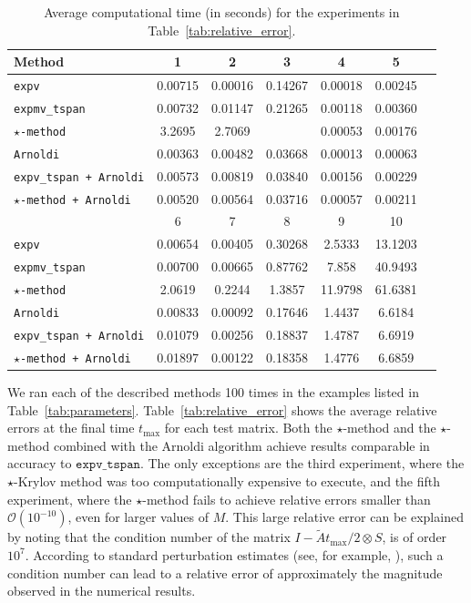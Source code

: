 \documentclass[final,1p,times,number]{elsarticle}
\theoremstyle{plain}%
\begin{document}
\begin{table}[t]
\centering
\caption{Average computational time (in seconds) for the experiments in Table~\ref{tab:relative_error}.}
\label{tab:computational_time}
\begin{tabular}{lcccccc}
\toprule
\textbf{Method} & 1 & 2 & 3 & 4 & 5  \\ 
\midrule
\texttt{expv}                     & 0.00715 & 0.00016 & 0.14267 & 0.00018 & 0.00245 \\ 
\texttt{expmv\_tspan}             & 0.00732 & 0.01147 & 0.21265 & 0.00118 & 0.00360 \\  
\texttt{$\star$-method}           & 3.2695 &  2.7069  &               & 0.00053 & 0.00176 \\ 
\texttt{Arnoldi}                  & 0.00363 & 0.00482 & 0.03668 & 0.00013 & 0.00063 \\
\texttt{expv\_tspan + Arnoldi}    & 0.00573 & 0.00819 & 0.03840 & 0.00156 & 0.00229 \\  
\texttt{$\star$-method + Arnoldi} & 0.00520 & 0.00564 & 0.03716 & 0.00057 &  0.00211 \\  
\midrule
 & 6 & 7 & 8 & 9 & 10  \\ 
\midrule
\texttt{expv}                     & 0.00654 & 0.00405 & 0.30268 & 2.5333 & 13.1203 \\
\texttt{expmv\_tspan}             & 0.00700 & 0.00665 & 0.87762 & 7.858 & 40.9493 \\    
\texttt{$\star$-method}           & 2.0619  & 0.2244  & 1.3857 & 11.9798 & 61.6381 \\
\texttt{Arnoldi}                  & 0.00833 & 0.00092 & 0.17646 & 1.4437 & 6.6184 \\
\texttt{expv\_tspan + Arnoldi}    & 0.01079 & 0.00256 & 0.18837 & 1.4787 & 6.6919 \\  
\texttt{$\star$-method + Arnoldi} & 0.01897 & 0.00122 & 0.18358 & 1.4776 & 6.6859 \\  
        \bottomrule
\end{tabular}
\end{table}

We ran each of the described methods 100 times in the examples listed in Table~\ref{tab:parameters}. Table~\ref{tab:relative_error} shows the average relative errors at the final time $t_\text{max}$ for each test matrix. Both the $\star$-method and the $\star$-method combined with the Arnoldi algorithm achieve results comparable in accuracy to $\texttt{expv\_tspan}$.
The only exceptions are the third experiment, where the $\star$-Krylov method was too computationally expensive to execute, and the fifth experiment, where the $\star$-method fails to achieve relative errors smaller than $\mathcal{O}(10^{-10})$, even for larger values of $M$.
This large relative error can be explained by noting that the condition number of the matrix
$I - \tilde{A} t_{\max}/2 \otimes S$,
is of order \(10^{7}\). According to standard perturbation estimates (see, for example, \cite[Chapter~16]{Hig02book}), such a condition number can lead to a relative error of approximately the magnitude observed in the numerical results.
\end{document}
